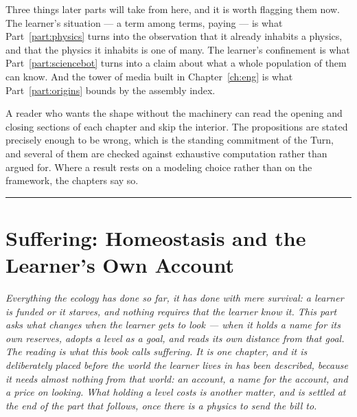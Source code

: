 \documentclass[12pt,openright,twoside]{book}
\theoremstyle{remark}
\theoremstyle{plain}
\theoremstyle{remark}
\theoremstyle{plain}
\theoremstyle{plain}
\begin{document}
Three things later parts will take from here, and it is worth flagging
them now.
The learner's situation --- a term among terms, paying --- is what
Part~\ref{part:physics} turns into the observation that it already
inhabits a physics, and that the physics it inhabits is one of many.
The learner's confinement is what Part~\ref{part:sciencebot} turns into a
claim about what a whole population of them can know.
And the tower of media built in Chapter~\ref{ch:eng} is what
Part~\ref{part:origins} bounds by the assembly index.

A reader who wants the shape without the machinery can read the opening and
closing sections of each chapter and skip the interior.
The propositions are stated precisely enough to be wrong, which is the
standing commitment of the Turn, and several of them are checked against
exhaustive computation rather than argued for.
Where a result rests on a modeling choice rather than on the framework, the
chapters say so.

\bigskip
\noindent\hrule
\bigskip


\part{Suffering: Homeostasis and the Learner's Own Account}
\label{part:choice}

\vspace{1em}
\begin{mdframed}[backgroundcolor=remarkgray, linecolor=gray!60,
                 linewidth=1pt, topline=false, rightline=false,
                 bottomline=false]
\small\itshape
Everything the ecology has done so far, it has done with mere survival: a
learner is funded or it starves, and nothing requires that the learner
know it.
This part asks what changes when the learner gets to look --- when it
holds a name for its own reserves, adopts a level as a goal, and reads
its own distance from that goal.
The reading is what this book calls suffering.
It is one chapter, and it is deliberately placed before the world the
learner lives in has been described, because it needs almost nothing from
that world: an account, a name for the account, and a price on looking.
What holding a level \emph{costs} is another matter, and is settled at the
end of the part that follows, once there is a physics to send the bill
to.
\end{mdframed}
\end{document}

